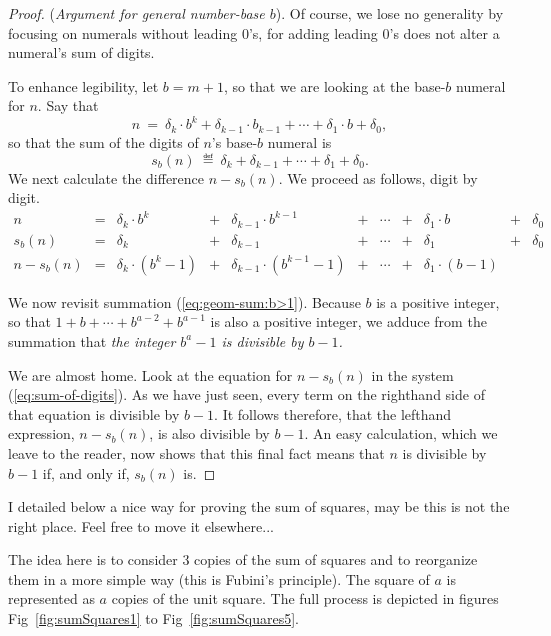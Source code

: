 \begin{proof}
({\it Argument for general number-base $b$}).
%
Of course, we lose no generality by focusing on numerals without
leading $0$'s, for adding leading $0$'s does not alter a numeral's sum
of digits.

To enhance legibility, let $b = m+1$, so that we are looking at the
base-$b$ numeral for $n$.  Say that
\[ n \ = \ \delta_k \cdot b^k + \delta_{k-1} \cdot b_{k-1} + \cdots +
\delta_1 \cdot b + \delta_0, \]
so that the sum of the digits of $n$'s base-$b$ numeral is
\[ s_b(n) \ \eqdef \ \delta_k + \delta_{k-1} + \cdots + \delta_1 + \delta_0. \]
We next calculate the difference $n - s_b(n)$.  We proceed as
follows, digit by digit.
\begin{equation}
\label{eq:sum-of-digits}
\begin{array}{ccccccccccc}
n & = &
\delta_k \cdot b^k & + & \delta_{k-1} \cdot b^{k-1} & + & \cdots
  & + & \delta_1 \cdot b & + & \delta_0 \\
s_b(n) & = &
\delta_k & + & \delta_{k-1} & + & \cdots & + & \delta_1 & + & \delta_0 \\
\hline
n - s_b(n) & = &
\delta_k \cdot (b^k -1) & + &
\delta_{k-1} \cdot (b^{k-1} -1) & + &
\cdots & + &
\delta_1 \cdot (b-1) & & 
\end{array}
\end{equation}

\medskip

We now revisit summation (\ref{eq:geom-sum:b>1}).  Because $b$ is a
positive integer, so that $1 + b + \cdots + b^{a-2} + b^{a-1}$ is also
a positive integer, we adduce from the summation that {\em the integer
  $b^a -1$ is divisible by $b-1$.}

We are almost home.  Look at the equation for $n - s_b(n)$ in the
system (\ref{eq:sum-of-digits}).  As we have just seen, every term on
the righthand side of that equation is divisible by $b-1$.  It follows
therefore, that the lefthand expression, $n - s_b(n)$, is also
divisible by $b-1$.  An easy calculation, which we leave to the
reader, now shows that this final fact means that $n$ is divisible by
$b-1$ if, and only if, $s_b(n)$ is.
\end{proof}

\medskip
{\Denis I detailed below a nice way for proving the sum of squares, may be this is not the right place.
Feel free to move it elsewhere...}

The idea here is to consider $3$ copies of the sum of squares and to reorganize them in a more simple way (this is Fubini's principle).
The square of $a$ is represented as $a$ copies of the unit square.
The full process is depicted in figures Fig~\ref{fig:sumSquares1} to Fig~\ref{fig:sumSquares5}.

